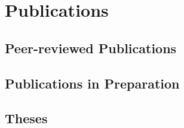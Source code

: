 \ifacademic
    \section{Publications}
        \subsection{Peer-reviewed Publications}
        \begin{refsection}
        	\vspace{2mm}
        	\onehalfspacing
            \nocite{
            	DiBaldassarre2018,
                Breinl2017,
                GironsLopez2017,
                GironsLopez2017a,
                GironsLopez2016a,
                Mbanguka2016,
                GironsLopez2015
            }
            \printbibliography[heading=none]
        \end{refsection}
        \subsection{Publications in Preparation}
        \begin{refsection}
        	\vspace{2mm}
        	\onehalfspacing
            \nocite{
            	GironsLopez2018b,
            	GironsLopez2018c,
                Rivera2018,
                Rivera2018a
            }
            \printbibliography[heading=none]
        \end{refsection}
        \subsection{Theses}
        \begin{refsection}
        	\vspace{2mm}
        	\onehalfspacing
            \nocite{
                GironsLopez2016,
                GironsLopez2011
            }
            \printbibliography[heading=none]
        \end{refsection}
